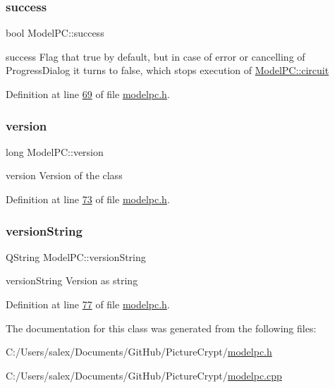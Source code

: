 \subsubsection{\texorpdfstring{success}{success}}
{\footnotesize\ttfamily bool Model\+P\+C\+::success}



success Flag that true by default, but in case of error or cancelling of Progress\+Dialog it turns to false, which stops execution of \mbox{\hyperlink{class_model_p_c_a1d0091062a0c836b283ec2f67411623b}{Model\+P\+C\+::circuit}} 



Definition at line \mbox{\hyperlink{modelpc_8h_source_l00069}{69}} of file \mbox{\hyperlink{modelpc_8h_source}{modelpc.\+h}}.

\mbox{\label{class_model_p_c_a5af48ab89e19be42a94c34ba00249401}} 
\subsubsection{\texorpdfstring{version}{version}}
{\footnotesize\ttfamily long Model\+P\+C\+::version}



version Version of the class 



Definition at line \mbox{\hyperlink{modelpc_8h_source_l00073}{73}} of file \mbox{\hyperlink{modelpc_8h_source}{modelpc.\+h}}.

\mbox{\label{class_model_p_c_a5f426725ccf7eefd3c77ea8c720264c9}} 
\subsubsection{\texorpdfstring{version\+String}{versionString}}
{\footnotesize\ttfamily Q\+String Model\+P\+C\+::version\+String}



version\+String Version as string 



Definition at line \mbox{\hyperlink{modelpc_8h_source_l00077}{77}} of file \mbox{\hyperlink{modelpc_8h_source}{modelpc.\+h}}.



The documentation for this class was generated from the following files\+:\begin{DoxyCompactItemize}
\item 
C\+:/\+Users/salex/\+Documents/\+Git\+Hub/\+Picture\+Crypt/\mbox{\hyperlink{modelpc_8h}{modelpc.\+h}}\item 
C\+:/\+Users/salex/\+Documents/\+Git\+Hub/\+Picture\+Crypt/\mbox{\hyperlink{modelpc_8cpp}{modelpc.\+cpp}}\end{DoxyCompactItemize}
